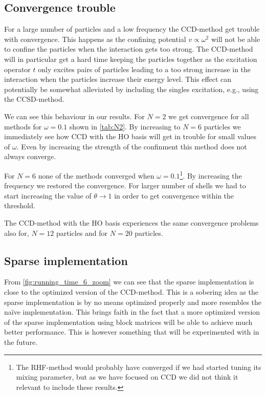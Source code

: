 \documentclass[
    a4paper, aps, twocolumn, floatfix, superscriptaddress,
    nofootinbib]{revtex4-1}
\newcommand{\1}{\mathds{1}}
\begin{document}
    \subsection{Convergence trouble}
        For a large number of particles and a low frequency the CCD-method get
        trouble with convergence. This happens as the confining potential $v
        \propto \omega^2$ will not be able to confine the particles when the
        interaction gets too strong. The CCD-method will in particular get a
        hard time keeping the particles together as the excitation operator $t$
        only excites pairs of particles leading to a too strong increase in the
        interaction when the particles increase their energy level. This effect
        can potentially be somewhat alleviated by including the singles
        excitation, e.g., using the CCSD-method.

        We can see this behaviour in our results. For $N = 2$ we get convergence
        for all methods for $\omega = 0.1$ shown in \autoref{tab:N2}. By
        increasing to $N = 6$ particles we immediately see how CCD with the HO
        basis will get in trouble for small values of $\omega$. Even by
        increasing the strength of the confinment this method does not always
        converge.

        For $N = 6$ none of the methods converged when $\omega =
        0.1$\footnote{The RHF-method would probably have converged if we had
        started tuning its mixing parameter, but as we have focused on CCD we did
        not think it relevant to include these results.}. By increasing the
        frequency we restored the convergence. For larger number of shells we
        had to start increasing the value of $\theta \to 1$ in order to get
        convergence within the threshold.

        The CCD-method with the HO basis experiences the same convergence
        problems also for, $N=12$ particles and for $N=20$ particles.

    \subsection{Sparse implementation}
        From \autoref{fig:running_time_6_zoom} we can see that the sparse
        implementation is close to the optimized version of the CCD-method. This
        is a sobering idea as the sparse implementation is by no means optimized
        properly and more resembles the naïve implementation. This brings faith
        in the fact that a more optimized version of the sparse implementation
        using block matrices will be able to achieve much better performance.
        This is however something that will be experimented with in the future.
\end{document}
